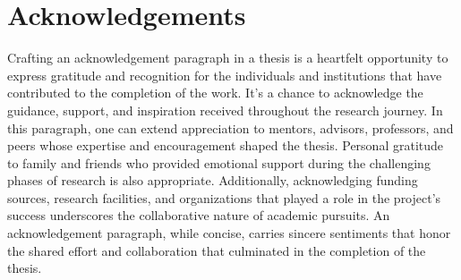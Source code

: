 \section*{Acknowledgements}

Crafting an acknowledgement paragraph in a thesis is a heartfelt opportunity to express gratitude and recognition for the individuals and institutions that have contributed to the completion of the work. It's a chance to acknowledge the guidance, support, and inspiration received throughout the research journey. In this paragraph, one can extend appreciation to mentors, advisors, professors, and peers whose expertise and encouragement shaped the thesis. Personal gratitude to family and friends who provided emotional support during the challenging phases of research is also appropriate. Additionally, acknowledging funding sources, research facilities, and organizations that played a role in the project's success underscores the collaborative nature of academic pursuits. An acknowledgement paragraph, while concise, carries sincere sentiments that honor the shared effort and collaboration that culminated in the completion of the thesis.